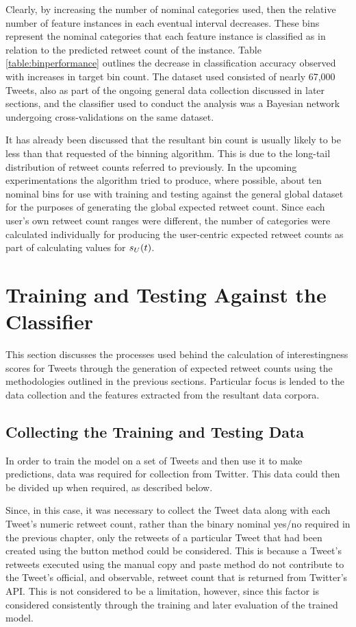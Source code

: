 Clearly, by increasing the number of nominal categories used, then the relative number of feature instances in each eventual interval decreases. These bins represent the nominal categories that each feature instance is classified as in relation to the predicted retweet count of the instance. Table \ref{table:binperformance} outlines the decrease in classification accuracy observed with increases in target bin count. The dataset used consisted of nearly 67,000 Tweets, also as part of the ongoing general data collection discussed in later sections, and the classifier used to conduct the analysis was a Bayesian network undergoing cross-validations on the same dataset.

It has already been discussed that the resultant bin count is usually likely to be less than that requested of the binning algorithm. This is due to the long-tail distribution of retweet counts referred to previously. In the upcoming experimentations the algorithm tried to produce, where possible, about ten nominal bins for use with training and testing against the general global dataset for the purposes of generating the global expected retweet count. Since each user's own retweet count ranges were different, the number of categories were calculated individually for producing the user-centric expected retweet counts as part of calculating values for $s_U(t)$.


\section{Training and Testing Against the Classifier}
This section discusses the processes used behind the calculation of interestingness scores for Tweets through the generation of expected retweet counts using the methodologies outlined in the previous sections. Particular focus is lended to the data collection and the features extracted from the resultant data corpora.


\subsection{Collecting the Training and Testing Data}
In order to train the model on a set of Tweets and then use it to make predictions, data was required for collection from Twitter. This data could then be divided up when required, as described below.

Since, in this case, it was necessary to collect the Tweet data along with each Tweet's numeric retweet count, rather than the binary nominal yes/no required in the previous chapter, only the retweets of a particular Tweet that had been created using the button method could be considered. This is because a Tweet's retweets executed using the manual copy and paste method do not contribute to the Tweet's official, and observable, retweet count that is returned from Twitter's API. This is not considered to be a limitation, however, since this factor is considered consistently through the training and later evaluation of the trained model.

